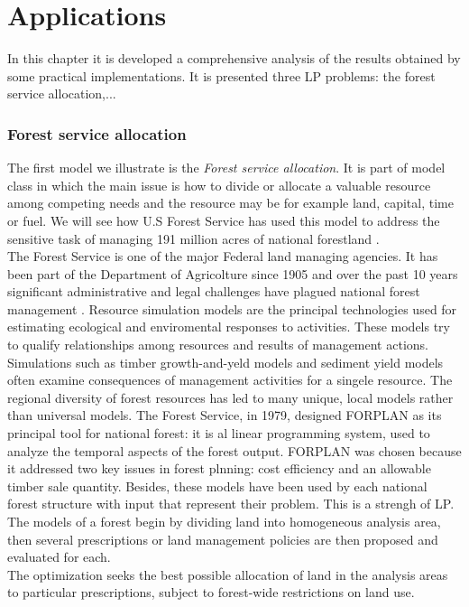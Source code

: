 \documentclass[a4paper,10 pt,titlepage,twoside]{book}
\theoremstyle{plain}
\theoremstyle{definition}
\theoremstyle{remark}
\begin{document}
\chapter{Applications}
In this chapter it is developed a comprehensive analysis of the results obtained by some practical implementations. It is presented three LP problems: the forest service allocation,...\\
\subsection*{Forest service allocation} 
The first model we illustrate is the \textit{Forest service allocation}. It is part of model class in which the main issue is how to divide or allocate a valuable resource among competing needs and the resource may be for example land, capital, time or fuel. We will see how U.S Forest Service has used this model to address the sensitive task of managing 191 million acres of national forestland \cite{(Natural)}.\\
The Forest Service is one of the major Federal land managing agencies. It has been part of the Department of Agricolture since 1905 and over the past 10 years significant administrative and legal challenges have plagued national forest management \cite{ForSer}. Resource simulation models are the principal technologies used for estimating ecological and enviromental responses to activities. These models try to qualify relationships among resources and results of management actions. Simulations such as timber growth-and-yeld models and sediment yield models often examine consequences of management activities for a singele resource. The regional diversity of forest resources has led to many unique, local models rather than universal models. The Forest Service, in 1979, designed FORPLAN as its principal tool for national forest: it is al linear programming system, used to analyze the temporal aspects of the forest output. FORPLAN was chosen because it addressed two key issues in forest plnning: cost efficiency and an allowable timber sale quantity. Besides, these models have been used by each national forest structure with input that represent their problem. This is a strengh of LP. \\
The models of a forest begin  by dividing land into homogeneous analysis area, then several prescriptions or land management policies are then proposed and evaluated for each. \\The optimization seeks the best possible allocation of land in the analysis areas to particular prescriptions, subject to forest-wide restrictions on land use.
\end{document}
